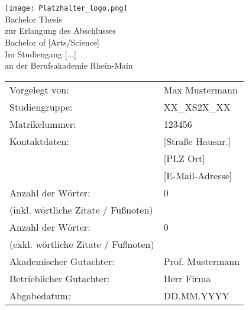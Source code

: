 \begin{center}
     \\
     \\[3ex]%
    \texttt{[image: Platzhalter\_logo.png]} \\[3ex]
    \large{Bachelor Thesis\\ [-10pt]
        zur Erlangung des Abschlusses\\ [-10pt]
        Bachelor of [Arts/Science]\\
        Im Studiengang [...]\\ [-10pt]
        an der Berufsakademie Rhein-Main
}
\end{center}

\renewcommand{\arraystretch}{2.5}%
\begin{table}[h]
    \setlength{\tabcolsep}{32pt}
    \begin{tabularx}{\textwidth}{l l}
        Vorgelegt von:                      & Max Mustermann   \\ [-15pt]
        Studiengruppe:                      & XX\_XS2X\_XX     \\ [-15pt]
        Matrikelummer:                      & 123456           \\ [-15pt]
        Kontaktdaten:                       & [Straße Hausnr.] \\ [-15pt]
        ~                                   & [PLZ Ort]        \\ [-15pt]
        ~                                   & [E-Mail-Adresse] \\
        Anzahl der Wörter:                  & 0                \\ [-18pt]
        (inkl. wörtliche Zitate / Fußnoten) & ~                \\
        Anzahl der Wörter:                  & 0                \\ [-18pt]
        (exkl. wörtliche Zitate / Fußnoten) & ~                \\
        Akademischer Gutachter:             & Prof. Mustermann \\ [-15pt]
        Betrieblicher Gutachter:            & Herr Firma       \\
        Abgabedatum:                        & DD.MM.YYYY       \\
    \end{tabularx}
\end{table}